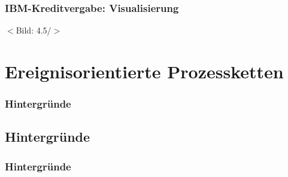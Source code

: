 \documentclass{beamer}
\begin{document}
 \begin{frame}
  \frametitle{IBM-Kreditvergabe: Visualisierung}
  $<$Bild: 4.5/$>$
 \end{frame}

 \section[Ereignisorientierte Prozessketten]{Ereignisorientierte Prozessketten}
 \begin{frame}
  \frametitle{Hintergründe}

 \end{frame}

 \subsection[Hintergründe]{Hintergründe}
 \begin{frame}
  \frametitle{Hintergründe}

 \end{frame}
\end{document}
